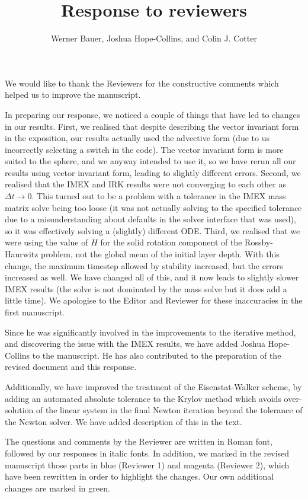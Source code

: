 \documentclass[a4paper,12pt]{article}
\title{Response to reviewers}
\author{Werner Bauer, Joshua Hope-Collins, and Colin J. Cotter}
\begin{document}
\maketitle

We would like to thank the Reviewers for the constructive comments
which helped us to improve the manuscript.

In preparing our response, we noticed a couple of things that have led
to changes in our results. First, we realised that despite describing
the vector invariant form in the exposition, our results actually used
the advective form (due to us incorrectly selecting a switch in the
code).  The vector invariant form is more suited to the sphere, and we
anyway intended to use it, so we have rerun all our results using
vector invariant form, leading to slightly different errors. Second,
we realised that the IMEX and IRK results were not converging to each
other as $\Delta t\to 0$. This turned out to be a problem with a
tolerance in the IMEX mass matrix solve being too loose (it was not
actually solving to the specified tolerance due to a misunderstanding
about defaults in the solver interface that was used), so it was
effectively solving a (slightly) different ODE. Third, we realised that we were
using the value of $H$ for the solid rotation component of the
Rossby-Haurwitz problem, not the global mean of the initial layer
depth.  With this change, the maximum timestep allowed by stability
increased, but the errors increased as well. We have changed all of
this, and it now leads to slightly slower IMEX results (the solve is
not dominated by the mass solve but it does add a little time). We
apologise to the Editor and Reviewer for these inaccuracies in the
first manuscript.

Since he was significantly involved in the improvements to the iterative
method, and discovering the issue with the IMEX results, we have added
Joshua Hope-Collins to the manuscript. He has also contributed to the
preparation of the revised document and this response.

Additionally, we have improved the treatment of the Eisenstat-Walker
scheme, by adding an automated absolute tolerance to the Krylov method
which avoids over-solution of the linear system in the final Newton
iteration beyond the tolerance of the Newton solver. We have added 
description of this in the text.

The questions and comments by the Reviewer are written in Roman font,
followed by our responses in italic fonts. In addition, we marked in
the revised manuscript those parts in blue (Reviewer 1) and magenta
(Reviewer 2), which have been rewritten in order to highlight the
changes. Our own additional changes are marked in green.
\end{document}
